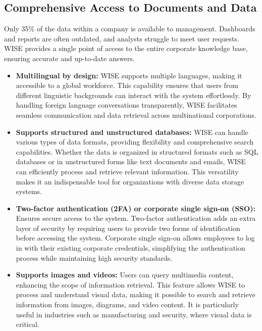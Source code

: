 \subsection{Comprehensive Access to Documents and Data}

Only 35\% of the data within a company is available to management. Dashboards and reports are often outdated, and analysts struggle to meet user requests. WISE provides a single point of access to the entire corporate knowledge base, ensuring accurate and up-to-date answers.

\begin{itemize}
    \item \textbf{Multilingual by design:} WISE supports multiple languages, making it accessible to a global workforce. This capability ensures that users from different linguistic backgrounds can interact with the system effortlessly. By handling foreign language conversations transparently, WISE facilitates seamless communication and data retrieval across multinational corporations.
    
    \item \textbf{Supports structured and unstructured databases:} WISE can handle various types of data formats, providing flexibility and comprehensive search capabilities. Whether the data is organized in structured formats such as SQL databases or in unstructured forms like text documents and emails, WISE can efficiently process and retrieve relevant information. This versatility makes it an indispensable tool for organizations with diverse data storage systems.
    
    \item \textbf{Two-factor authentication (2FA) or corporate single sign-on (SSO):} Ensures secure access to the system. Two-factor authentication adds an extra layer of security by requiring users to provide two forms of identification before accessing the system. Corporate single sign-on allows employees to log in with their existing corporate credentials, simplifying the authentication process while maintaining high security standards.
    
    \item \textbf{Supports images and videos:} Users can query multimedia content, enhancing the scope of information retrieval. This feature allows WISE to process and understand visual data, making it possible to search and retrieve information from images, diagrams, and video content. It is particularly useful in industries such as manufacturing and security, where visual data is critical.
    

\end{itemize}
